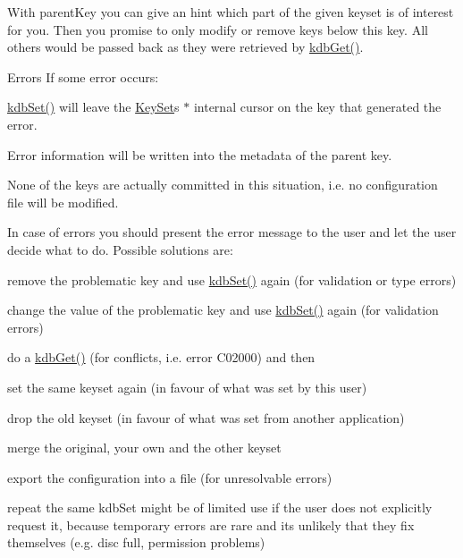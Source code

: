 With {\ttfamily parent\+Key} you can give an hint which part of the given keyset is of interest for you. Then you promise to only modify or remove keys below this key. All others would be passed back as they were retrieved by \mbox{\hyperlink{group__kdb_ga28e385fd9cb7ccfe0b2f1ed2f62453a1}{kdb\+Get()}}.

\begin{DoxyParagraph}{Errors}
If some error occurs\+:
\begin{DoxyItemize}
\item \mbox{\hyperlink{group__kdb_ga11436b058408f83d303ca5e996832bcf}{kdb\+Set()}} will leave the \mbox{\hyperlink{classkdb_1_1KeySet}{Key\+Set}}\textquotesingle{}s $\ast$ internal cursor on the key that generated the error.
\item Error information will be written into the metadata of the parent key.
\item None of the keys are actually committed in this situation, i.\+e. no configuration file will be modified.
\end{DoxyItemize}
\end{DoxyParagraph}
In case of errors you should present the error message to the user and let the user decide what to do. Possible solutions are\+:
\begin{DoxyItemize}
\item remove the problematic key and use \mbox{\hyperlink{group__kdb_ga11436b058408f83d303ca5e996832bcf}{kdb\+Set()}} again (for validation or type errors)
\item change the value of the problematic key and use \mbox{\hyperlink{group__kdb_ga11436b058408f83d303ca5e996832bcf}{kdb\+Set()}} again (for validation errors)
\item do a \mbox{\hyperlink{group__kdb_ga28e385fd9cb7ccfe0b2f1ed2f62453a1}{kdb\+Get()}} (for conflicts, i.\+e. error C02000) and then
\begin{DoxyItemize}
\item set the same keyset again (in favour of what was set by this user)
\item drop the old keyset (in favour of what was set from another application)
\item merge the original, your own and the other keyset
\end{DoxyItemize}
\item export the configuration into a file (for unresolvable errors)
\item repeat the same kdb\+Set might be of limited use if the user does not explicitly request it, because temporary errors are rare and its unlikely that they fix themselves (e.\+g. disc full, permission problems)
\end{DoxyItemize}


